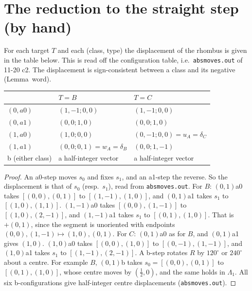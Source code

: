 \documentclass[11pt]{article}
\theoremstyle{definition}\newtheorem{definition}[theorem]{Definition}\newtheorem{remark}[theorem]{Remark}
\begin{document}
\section{The reduction to the straight step (by hand)}\label{sec:red}
\begin{lemma}[displacements]\label{lem:disp}
For each target $T$ and each (class, type) the displacement of the rhombus is given in the table below. This is read off the configuration table, i.e.\ \texttt{absmoves.out} of 11-20 c2. The displacement is sign-consistent between a class and its negative (Lemma~word).
\begin{center}\begin{tabular}{lll}\toprule
 & $T=B$ & $T=C$\\\midrule
$(0,a0)$ & $(1,-1;0,0)$ & $(1,-1;0,0)$\\
$(0,a1)$ & $(0,0;1,0)$ & $(0,0;1,0)$\\
$(1,a0)$ & $(1,0;0,0)$ & $(0,-1;0,0)=u_A=\delta_C$\\
$(1,a1)$ & $(0,0;0,1)=w_A=\delta_B$ & $(0,0;1,-1)$\\
b (either class) & a half-integer vector & a half-integer vector\\\bottomrule
\end{tabular}\end{center}
\end{lemma}
\begin{proof}
An a0-step moves $s_0$ and fixes $s_1$, and an a1-step the reverse. So the displacement is that of $s_0$ (resp.\ $s_1$), read from \texttt{absmoves.out}.
For $B$: $(0,1)$a0 takes $[(0,0),(0,1)]$ to $[(1,-1),(1,0)]$, and $(0,1)$a1 takes $s_1$ to $[(1,0),(1,1)]$. $(1,-1)$a0 takes $[(0,0),(1,-1)]$ to $[(1,0),(2,-1)]$, and $(1,-1)$a1 takes $s_1$ to $[(0,1),(1,0)]$. That is $+(0,1)$, since the segment is unoriented with endpoints $(0,0),(1,-1)\mapsto(1,0),(0,1)$.
For $C$: $(0,1)$a0 as for $B$, and $(0,1)$a1 gives $(1,0)$. $(1,0)$a0 takes $[(0,0),(1,0)]$ to $[(0,-1),(1,-1)]$, and $(1,0)$a1 takes $s_1$ to $[(1,-1),(2,-1)]$.
A b-step rotates $R$ by $120^\circ$ or $240^\circ$ about a centre. For example $B$, $(0,1)$b takes $s_0=[(0,0),(0,1)]$ to $[(0,1),(1,0)]$, whose centre moves by $(\tfrac12,0)$, and the same holds in $\Lambda_1$. All six b-configurations give half-integer centre displacements (\texttt{absmoves.out}).
\end{proof}
\end{document}
